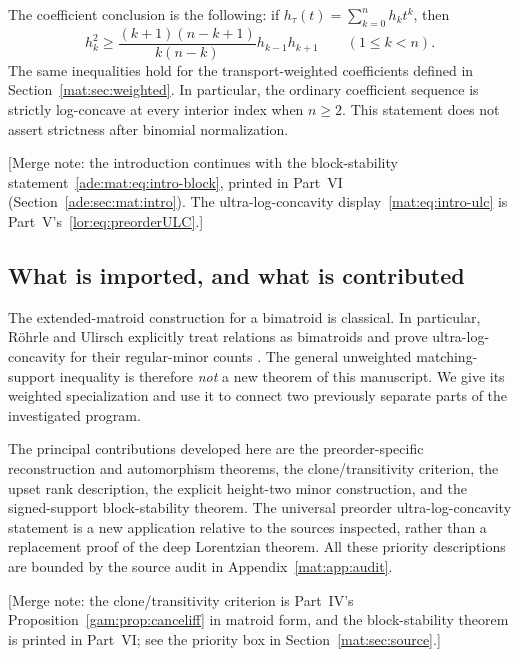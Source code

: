 \documentclass[11pt]{article}
\numberwithin{equation}{section}
\theoremstyle{definition}
\begin{document}
The coefficient conclusion is the following: if
$h_\tau(t)=\sum_{k=0}^n h_k t^k$, then
\begin{equation}
\boxed{\quad
 h_k^2\geq
 \frac{(k+1)(n-k+1)}{k(n-k)}h_{k-1}h_{k+1}
 \qquad(1\leq k<n).
\quad}\label{mat:eq:intro-ulc}
\end{equation}
The same inequalities hold for the transport-weighted coefficients defined
in Section~\ref{mat:sec:weighted}. In particular, the ordinary coefficient
sequence is strictly log-concave at every interior index when $n\geq2$.
This statement does not assert strictness after binomial normalization.

[Merge note: the introduction continues with the block-stability
statement~\eqref{ade:mat:eq:intro-block}, printed in Part~VI
(Section~\ref{ade:sec:mat:intro}). The ultra-log-concavity
display~\eqref{mat:eq:intro-ulc} is Part~V's~\eqref{lor:eq:preorderULC}.]

\subsection{What is imported, and what is contributed}
The extended-matroid construction for a bimatroid is classical. In
particular, R\"ohrle and Ulirsch explicitly treat relations as bimatroids and
prove ultra-log-concavity for their regular-minor counts
\cite[Proposition 2.2, Example 2.4, Theorem A]{RU}. The general unweighted
matching-support inequality is therefore \emph{not} a new theorem of this
manuscript. We give its weighted specialization and use it to connect two
previously separate parts of the investigated program.

The principal contributions developed here are the preorder-specific
reconstruction and automorphism theorems, the clone/transitivity criterion,
the upset rank description, the explicit height-two minor construction,
and the signed-support block-stability theorem. The universal preorder
ultra-log-concavity statement is a new application relative to the sources
inspected, rather than a replacement proof of the deep Lorentzian theorem.
All these priority descriptions are bounded by the source audit in
Appendix~\ref{mat:app:audit}.

[Merge note: the clone/transitivity criterion is Part~IV's
Proposition~\ref{gam:prop:canceliff} in matroid form, and the block-stability
theorem is printed in Part~VI; see the priority box in
Section~\ref{mat:sec:source}.]
\end{document}

